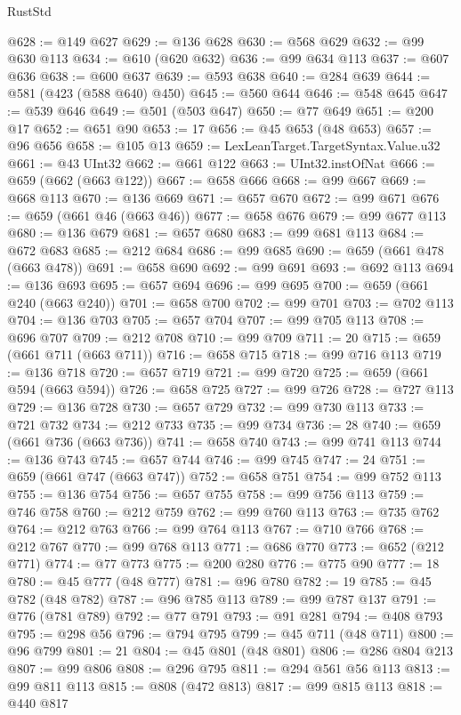 \begin{lexlean}{RustStd}
\begin{coremodule}
@628 := @149 @627
@629 := @136 @628
@630 := @568 @629
@632 := @99 @630 @113
@634 := @610 (@620 @632)
@636 := @99 @634 @113
@637 := @607 @636
@638 := @600 @637
@639 := @593 @638
@640 := @284 @639
@644 := @581 (@423 (@588 @640) @450)
@645 := @560 @644
@646 := @548 @645
@647 := @539 @646
@649 := @501 (@503 @647)
@650 := @77 @649
@651 := @200 @17
@652 := @651 @90
@653 := 17
@656 := @45 @653 (@48 @653)
@657 := @96 @656
@658 := @105 @13
@659 := LexLeanTarget.TargetSyntax.Value.u32
@661 := @43 UInt32
@662 := @661 @122
@663 := UInt32.instOfNat
@666 := @659 (@662 (@663 @122))
@667 := @658 @666
@668 := @99 @667
@669 := @668 @113
@670 := @136 @669
@671 := @657 @670
@672 := @99 @671
@676 := @659 (@661 @46 (@663 @46))
@677 := @658 @676
@679 := @99 @677 @113
@680 := @136 @679
@681 := @657 @680
@683 := @99 @681 @113
@684 := @672 @683
@685 := @212 @684
@686 := @99 @685
@690 := @659 (@661 @478 (@663 @478))
@691 := @658 @690
@692 := @99 @691
@693 := @692 @113
@694 := @136 @693
@695 := @657 @694
@696 := @99 @695
@700 := @659 (@661 @240 (@663 @240))
@701 := @658 @700
@702 := @99 @701
@703 := @702 @113
@704 := @136 @703
@705 := @657 @704
@707 := @99 @705 @113
@708 := @696 @707
@709 := @212 @708
@710 := @99 @709
@711 := 20
@715 := @659 (@661 @711 (@663 @711))
@716 := @658 @715
@718 := @99 @716 @113
@719 := @136 @718
@720 := @657 @719
@721 := @99 @720
@725 := @659 (@661 @594 (@663 @594))
@726 := @658 @725
@727 := @99 @726
@728 := @727 @113
@729 := @136 @728
@730 := @657 @729
@732 := @99 @730 @113
@733 := @721 @732
@734 := @212 @733
@735 := @99 @734
@736 := 28
@740 := @659 (@661 @736 (@663 @736))
@741 := @658 @740
@743 := @99 @741 @113
@744 := @136 @743
@745 := @657 @744
@746 := @99 @745
@747 := 24
@751 := @659 (@661 @747 (@663 @747))
@752 := @658 @751
@754 := @99 @752 @113
@755 := @136 @754
@756 := @657 @755
@758 := @99 @756 @113
@759 := @746 @758
@760 := @212 @759
@762 := @99 @760 @113
@763 := @735 @762
@764 := @212 @763
@766 := @99 @764 @113
@767 := @710 @766
@768 := @212 @767
@770 := @99 @768 @113
@771 := @686 @770
@773 := @652 (@212 @771)
@774 := @77 @773
@775 := @200 @280
@776 := @775 @90
@777 := 18
@780 := @45 @777 (@48 @777)
@781 := @96 @780
@782 := 19
@785 := @45 @782 (@48 @782)
@787 := @96 @785 @113
@789 := @99 @787 @137
@791 := @776 (@781 @789)
@792 := @77 @791
@793 := @91 @281
@794 := @408 @793
@795 := @298 @56
@796 := @794 @795
@799 := @45 @711 (@48 @711)
@800 := @96 @799
@801 := 21
@804 := @45 @801 (@48 @801)
@806 := @286 @804 @213
@807 := @99 @806
@808 := @296 @795
@811 := @294 @561 @56 @113
@813 := @99 @811 @113
@815 := @808 (@472 @813)
@817 := @99 @815 @113
@818 := @440 @817

\end{coremodule}
\end{lexlean}
